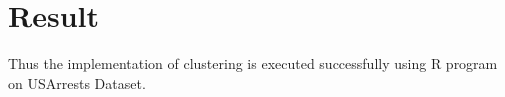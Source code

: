 \documentclass[a4paper,10pt]{article}
\begin{document}
\linebreak
\linebreak
\vfill
\section{Result}
Thus the implementation of clustering is executed successfully using R program on USArrests Dataset.
\end{document}
